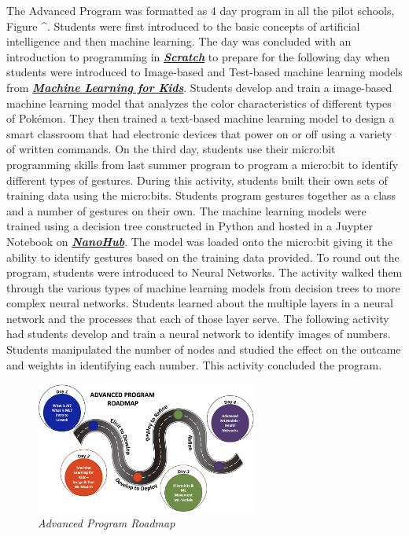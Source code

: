 \documentclass[
]{article}
\begin{document}
The Advanced Program was formatted as 4 day program in all the pilot
schools, Figure \^{}. Students were first introduced to the basic
concepts of artificial intelligence and then machine learning. The day
was concluded with an introduction to programming in
\textbf{\emph{\href{https://scratch.mit.edu/}{Scratch}}} to prepare for
the following day when students were introduced to Image-based and
Test-based machine learning models from
\textbf{\emph{\href{https://machinelearningforkids.co.uk/}{Machine
Learning for Kids}}}. Students develop and train a image-based machine
learning model that analyzes the color characteristics of different
types of Pokémon. They then trained a text-based machine learning model
to design a smart classroom that had electronic devices that power on or
off using a variety of written commands. On the third day, students use
their micro:bit programming skills from last summer program to program a
micro:bit to identify different types of gestures. During this activity,
students built their own sets of training data using the micro:bits.
Students program gestures together as a class and a number of gestures
on their own. The machine learning models were trained using a decision
tree constructed in Python and hosted in a Juypter Notebook on
\textbf{\emph{\href{https://nanohub.org/}{NanoHub}}}. The model was
loaded onto the micro:bit giving it the ability to identify gestures
based on the training data provided. To round out the program, students
were introduced to Neural Networks. The activity walked them through the
various types of machine learning models from decision trees to more
complex neural networks. Students learned about the multiple layers in a
neural network and the processes that each of those layer serve. The
following activity had students develop and train a neural network to
identify images of numbers. Students manipulated the number of nodes and
studied the effect on the outcame and weights in identifying each
number. This activity concluded the program.

\begin{figure}
\centering
\includegraphics[width=0.65\textwidth,height=\textheight]{Images/GGEE_23_Adv_roadmap.jpg}
\caption{\emph{Advanced Program Roadmap}}
\end{figure}
\end{document}
